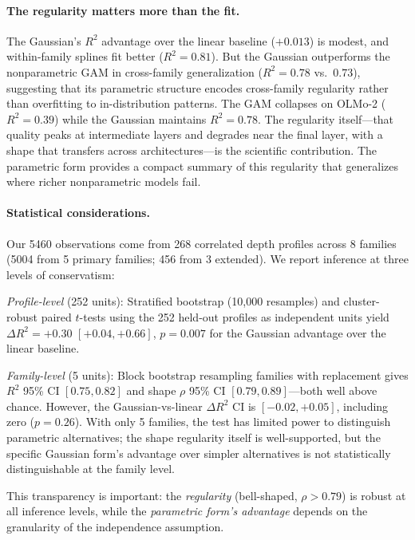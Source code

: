 \documentclass{article}
\begin{document}
\paragraph{The regularity matters more than the fit.}
The Gaussian's $R^2$ advantage over the linear baseline ($+0.013$) is modest, and within-family splines fit better ($R^2 = 0.81$). But the Gaussian outperforms the nonparametric GAM in cross-family generalization ($R^2 = 0.78$ vs.\ $0.73$), suggesting that its parametric structure encodes cross-family regularity rather than overfitting to in-distribution patterns. The GAM collapses on OLMo-2 ($R^2 = 0.39$) while the Gaussian maintains $R^2 = 0.78$. The regularity itself---that quality peaks at intermediate layers and degrades near the final layer, with a shape that transfers across architectures---is the scientific contribution. The parametric form provides a compact summary of this regularity that generalizes where richer nonparametric models fail.

\paragraph{Statistical considerations.}
Our 5460 observations come from 268 correlated depth profiles across 8 families (5004 from 5 primary families; 456 from 3 extended). We report inference at three levels of conservatism:

\emph{Profile-level} (252 units): Stratified bootstrap (10{,}000 resamples) and cluster-robust paired $t$-tests using the 252 held-out profiles as independent units yield $\Delta R^2 = +0.30$ $[+0.04, +0.66]$, $p = 0.007$ for the Gaussian advantage over the linear baseline.

\emph{Family-level} (5 units): Block bootstrap resampling families with replacement gives $R^2$ 95\% CI $[0.75, 0.82]$ and shape $\rho$ 95\% CI $[0.79, 0.89]$---both well above chance. However, the Gaussian-vs-linear $\Delta R^2$ CI is $[-0.02, +0.05]$, including zero ($p = 0.26$). With only 5 families, the test has limited power to distinguish parametric alternatives; the shape regularity itself is well-supported, but the specific Gaussian form's advantage over simpler alternatives is not statistically distinguishable at the family level.

This transparency is important: the \emph{regularity} (bell-shaped, $\rho > 0.79$) is robust at all inference levels, while the \emph{parametric form's advantage} depends on the granularity of the independence assumption.
\end{document}
